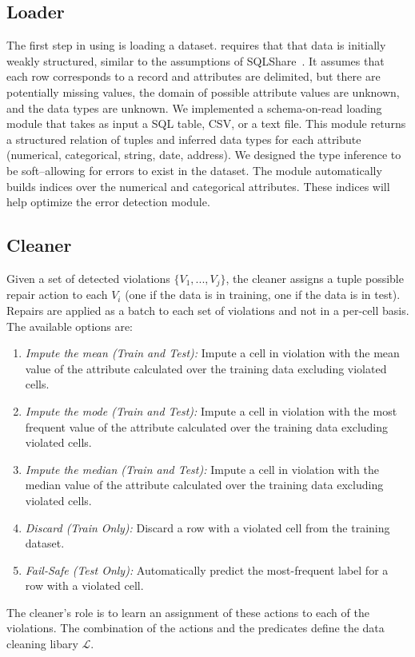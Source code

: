 \subsection{Loader}
The first step in using \sys is loading a dataset. \sys requires that that data is initially weakly structured, similar to the assumptions of SQLShare~\cite{howe2013sqlshare}. It assumes that each row corresponds to a record and attributes are delimited, but there are potentially missing values, the domain of possible attribute values are unknown, and the data types are unknown.
We implemented a schema-on-read loading module that takes as input a SQL table, CSV, or a text file.
This module returns a structured relation of tuples and inferred data types for each attribute (numerical, categorical, string, date, address).
We designed the type inference to be soft--allowing for errors to exist in the dataset.
The module automatically builds indices over the numerical and categorical attributes.
These indices will help optimize the error detection module.



\subsection{Cleaner}
Given a set of detected violations $\{V_1,...,V_j\}$, the cleaner assigns a tuple possible repair action to each $V_i$ (one if the data is in training, one if the data is in test).
Repairs are applied as a batch to each set of violations and not in a per-cell basis.
The available options are:
\begin{enumerate}
    \item \emph{Impute the mean (Train and Test): } Impute a cell in violation with the mean value of the attribute calculated over the training data excluding violated cells.
    \item \emph{Impute the mode (Train and Test): } Impute a cell in violation with the most frequent value of the attribute calculated over the training data excluding violated cells.
    \item \emph{Impute the median (Train and Test): }Impute a cell in violation with the median value of the attribute calculated over the training data excluding violated cells.
     \item \emph{Discard (Train Only): } Discard a row with a violated cell from the training dataset.
     \item \emph{Fail-Safe (Test Only): } Automatically predict the most-frequent label for a row with a violated cell.
\end{enumerate}

The cleaner's role is to learn an assignment of these actions to each of the violations.
The combination of the actions and the predicates define the data cleaning libary $\mathcal{L}$.







